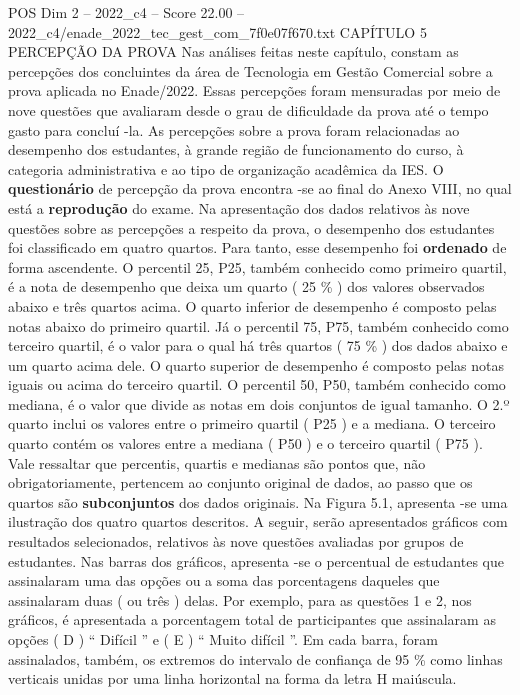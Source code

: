 \begin{textsample}{POS Dim 2 – 2022\_c4 – Score 22.00 – 2022\_c4/enade\_2022\_tec\_gest\_com\_7f0e07f670.txt}  \label{ex:f2_pos_027}
CAPÍTULO 5 PERCEPÇÃO DA PROVA Nas análises feitas neste capítulo, constam as percepções dos concluintes da área de Tecnologia em Gestão Comercial sobre a prova aplicada no Enade/2022.
Essas percepções foram mensuradas por meio de nove questões que avaliaram desde o grau de dificuldade da prova até o tempo gasto para concluí -la.
As percepções sobre a prova foram relacionadas ao desempenho dos estudantes, à grande região de funcionamento do curso, à categoria administrativa e ao tipo de organização acadêmica da IES.
O \textbf{questionário} de percepção da prova encontra -se ao final do Anexo VIII, no qual está a \textbf{reprodução} do exame.
Na apresentação dos dados relativos às nove questões sobre as percepções a respeito da prova, o desempenho dos estudantes foi classificado em quatro quartos.
Para tanto, esse desempenho foi \textbf{ordenado} de forma ascendente.
O percentil 25, P25, também conhecido como primeiro quartil, é a nota de desempenho que deixa um quarto ( 25 \% ) dos valores observados abaixo e três quartos acima.
O quarto inferior de desempenho é composto pelas notas abaixo do primeiro quartil.
Já o percentil 75, P75, também conhecido como terceiro quartil, é o valor para o qual há três quartos ( 75 \% ) dos dados abaixo e um quarto acima dele.
O quarto superior de desempenho é composto pelas notas iguais ou acima do terceiro quartil.
O percentil 50, P50, também conhecido como mediana, é o valor que divide as notas em dois conjuntos de igual tamanho.
O 2.º quarto inclui os valores entre o primeiro quartil ( P25 ) e a mediana.
O terceiro quarto contém os valores entre a mediana ( P50 ) e o terceiro quartil ( P75 ).
Vale ressaltar que percentis, quartis e medianas são pontos que, não obrigatoriamente, pertencem ao conjunto original de dados, ao passo que os quartos são \textbf{subconjuntos} dos dados originais.
Na Figura 5.1, apresenta -se uma ilustração dos quatro quartos descritos.
A seguir, serão apresentados gráficos com resultados selecionados, relativos às nove questões avaliadas por grupos de estudantes.
Nas barras dos gráficos, apresenta -se o percentual de estudantes que assinalaram uma das opções ou a soma das porcentagens daqueles que assinalaram duas ( ou três ) delas.
Por exemplo, para as questões 1 e 2, nos gráficos, é apresentada a porcentagem total de participantes que assinalaram as opções ( D ) “ Difícil ” e ( E ) “ Muito difícil ”.
Em cada barra, foram assinalados, também, os extremos do intervalo de confiança de 95 \% como linhas verticais unidas por uma linha horizontal na forma da letra H maiúscula.

\end{textsample}
